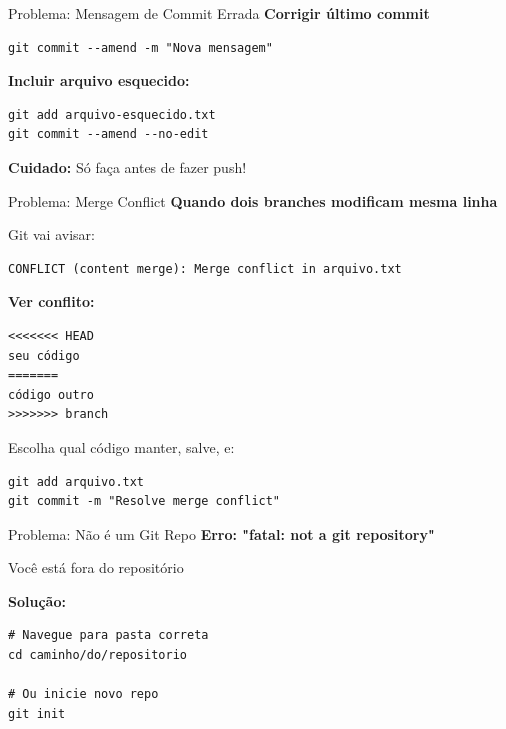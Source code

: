 \documentclass[11pt]{beamer}
\begin{document}
\begin{frame}{Problema: Mensagem de Commit Errada}
\textbf{Corrigir último commit}

\begin{lstlisting}
git commit --amend -m "Nova mensagem"
\end{lstlisting}

\vspace{0.5cm}

\textbf{Incluir arquivo esquecido:}

\begin{lstlisting}
git add arquivo-esquecido.txt
git commit --amend --no-edit
\end{lstlisting}

\vspace{0.3cm}

\textbf{Cuidado:} Só faça antes de fazer push!
\end{frame}

\begin{frame}{Problema: Merge Conflict}
\textbf{Quando dois branches modificam mesma linha}

Git vai avisar:
\begin{lstlisting}
CONFLICT (content merge): Merge conflict in arquivo.txt
\end{lstlisting}

\vspace{0.3cm}

\textbf{Ver conflito:}
\begin{lstlisting}
<<<<<<< HEAD
seu código
=======
código outro
>>>>>>> branch
\end{lstlisting}

Escolha qual código manter, salve, e:
\begin{lstlisting}
git add arquivo.txt
git commit -m "Resolve merge conflict"
\end{lstlisting}
\end{frame}

\begin{frame}{Problema: Não é um Git Repo}
\textbf{Erro: "fatal: not a git repository"}

Você está fora do repositório

\vspace{0.3cm}

\textbf{Solução:}
\begin{lstlisting}
# Navegue para pasta correta
cd caminho/do/repositorio

# Ou inicie novo repo
git init
\end{lstlisting}
\end{frame}
\end{document}
